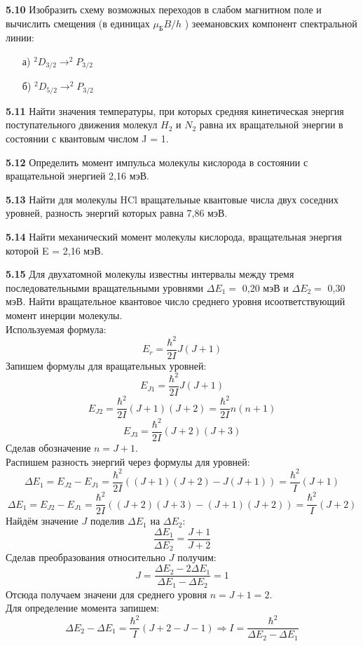 	\textbf{5.10 }
		Изобразить схему возможных переходов в слабом магнитном поле и
		вычислить смещения (в единицах \( \mu_\text{Б}B/h \) ) 
		зеемановских компонент спектральной линии: 
		\vspace*{-1em}
		\begin{itemize}\itemsep-8pt
			\item[а)] \( ^2D_{3/2} \rightarrow ^2P_{3/2} \)
			\item[б)] \( ^2D_{5/2} \rightarrow ^2P_{3/2} \)
		\end{itemize}

	\textbf{5.11 }
		Найти значения температуры, при которых средняя кинетическая энергия
		поступательного движения молекул \( H_2 \) и \( N_2 \) равна их 
		вращательной энергии в состоянии с квантовым числом J = 1.

	\textbf{5.12 }
		Определить момент импульса молекулы кислорода в состоянии с
		вращательной энергией 2,16 мэВ.

	\textbf{5.13 }
		Найти для молекулы HCl вращательные квантовые числа двух соседних
		уровней, разность энергий которых равна 7,86 мэВ.

	\textbf{5.14 }
		Найти механический момент молекулы кислорода, вращательная энергия
		которой E = 2,16 мэВ.

	\textbf{5.15 }
		Для двухатомной молекулы известны интервалы между тремя
		последовательными вращательными уровнями \( \Delta E_1 = \) 0,20 мэВ и
		\(\Delta E_2 = \) 0,30 мэВ. Найти вращательное квантовое число 
		среднего уровня исоответствующий момент инерции молекулы. \\
		Используемая формула: \[ E_r = \frac{\hbar^2}{2I}J(J+1) \]
		Запишем формулы для вращательных уровней:
		\[ E_{J1} = \frac{\hbar^2}{2I}J(J+1) \]
		\[ E_{J2} = \frac{\hbar^2}{2I}(J+1)(J+2) = \frac{\hbar^2}{2I}n(n+1) \]
		\[ E_{J3} = \frac{\hbar^2}{2I}(J+2)(J+3) \]
		Сделав обозначение \( n = J + 1 \). \\
		Распишем разность энергий через формулы для уровней:
		\[ 
			\Delta E_1 = E_{J2} - E_{J1} = 
			\frac{\hbar^2}{2I}((J+1)(J+2) - J(J+1)) = \frac{\hbar^2}{I}(J+1) 
		\]
		\[ 
			\Delta E_1 = E_{J2} - E_{J1} =
			\frac{\hbar^2}{2I}((J+2)(J+3)-(J+1)(J+2)) = \frac{\hbar^2}{I}(J+2)
		\]
		Найдём значение \( J \) поделив \( \Delta E_1 \) на \( \Delta E_2 \):
		\[ \frac{\Delta E_1}{\Delta E_2} = \frac{J+1}{J+2} \]
		Сделав преобразования относительно \( J \) получим:
		\[ J = \frac{\Delta E_2 - 2\Delta E_1}{\Delta E_1 - \Delta E_2} = 1 \]
		Отсюда получаем значени для среднего уровня \( n = J+1 = 2 \). \\
		Для определение момента запишем: 
		\[ 
			\Delta E_2 - \Delta E_1 = \frac{\hbar^2}{I}(J+2-J-1) 
			\Rightarrow I = \frac{\hbar^2}{\Delta E_2 - \Delta E_1}
		\]

